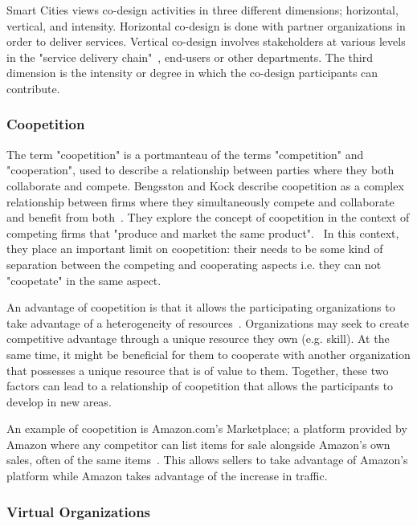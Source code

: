 Smart Cities views co-design activities in three different dimensions; horizontal, vertical, and intensity. Horizontal co-design is done with partner organizations in order to deliver services. Vertical co-design involves stakeholders at various levels in the "service delivery chain"~\cite{Cities}, end-users or other departments. The third dimension is the intensity or degree in which the co-design participants can contribute. 

\subsubsection{Coopetition}

The term "coopetition" is a portmanteau of the terms "competition" and "cooperation", used to describe a relationship between parties where they both collaborate and compete. Bengsston and Kock describe coopetition as a complex relationship between firms where they simultaneously compete and collaborate and benefit from both~\cite{Bengtsson2000}. They explore the concept of coopetition in the context of competing firms that "produce and market the same product".~\cite{Bengtsson2000} In this context, they place an important limit on coopetition: their needs to be some kind of separation between the competing and cooperating aspects i.e. they can not "coopetate" in the same aspect. 

An advantage of coopetition is that it allows the participating organizations to take advantage of a heterogeneity of resources~\cite{Bengtsson2000}. Organizations may seek to create competitive advantage through a unique resource they own (e.g. skill). At the same time, it might be beneficial for them to cooperate with another organization that possesses a unique resource that is of value to them. Together, these two factors can lead to a relationship of coopetition that allows the participants to develop in new areas. 

An example of coopetition is Amazon.com's Marketplace; a platform provided by Amazon where any  competitor can list items for sale alongside Amazon's own sales, often of the same items~\cite{UnknownAskIrina,Amazon.com}. This allows sellers to take advantage of Amazon's platform while Amazon takes advantage of the increase in traffic. 
 


\subsubsection{Virtual Organizations}

